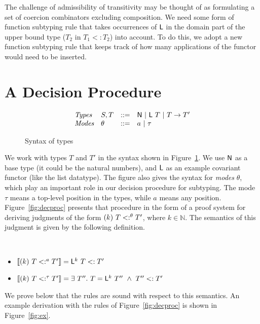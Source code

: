 \documentclass[acmsmall,screen,review]{acmart}
\begin{document}
The challenge of admissibility of transitivity may be thought of as formulating a set of
coercion combinators excluding composition.  We need some form of function subtyping
rule that takes occurrences of $\mathsf{L}$ in the domain part of the upper bound type ($T_2$ in $T_1 <: T_2$)
into account.  To do this, we adopt a new function subtyping rule that keeps track of how many applications
of the functor would need to be inserted.  

\section{A Decision Procedure}

\begin{figure}
  \[
  \begin{array}{llll}
    \textit{Types} & S, T & ::= & \mathsf{N}\ |\ \mathsf{L}\ T\ |\ T \to T' \\
    \textit{Modes} & \theta & ::= & a\ |\ \tau
  \end{array}
  \]
  \caption{Syntax of types}
  \label{fig:syn}
\end{figure}


  We work with types $T$ and $T'$ in the syntax shown in
  Figure~\ref{fig:syn}.  We use $\mathsf{N}$ as a base type (it could be
  the natural numbers), and $\mathsf{L}$ as an example covariant functor
  (like the list datatype).  The figure also gives the syntax for
  \emph{modes} $\theta$, which play an important role in our decision
  procedure for subtyping.  The mode $\tau$ means a top-level position
  in the types, while $a$ means any position. Figure~\ref{fig:decproc}
  presents that procedure in the form of a proof system for deriving
  judgments of the form $(k)\ T <:^{\theta} T'$, where
  $k\in\mathbb{N}$.  The semantics of this judgment is given by
  the following definition.

  \begin{definition}
\ 

  \begin{itemize}
  \item $\llbracket (k)\ T <:^{a} T' \rrbracket = \mathsf{L}^k\ T <: T'$
  \item $\llbracket (k)\ T <:^{\tau} T' \rrbracket = \exists\ T''.\ T = \mathsf{L}^k\ T''\ \wedge\ T'' <: T'$
  \end{itemize}
\end{definition}

We prove below that the rules are sound with respect to this semantics.  
An example derivation with the rules of Figure~\ref{fig:decproc} is shown in Figure~\ref{fig:ex}.
\end{document}

